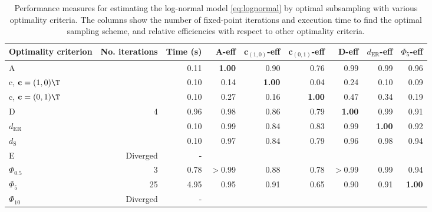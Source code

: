 \begin{table}[htb!]
\centering
\caption{Performance measures for estimating the log-normal model \eqref{eq:lognormal} by optimal subsampling with various optimality criteria. The columns show the number of fixed-point iterations and execution time to find the optimal sampling scheme, and relative efficiencies with respect to other optimality criteria.} 
\label{tab:baseline_impact_speed}
\begin{tabular}{lrrrrrrrr}
 Optimality criterion & No. iterations & Time (s) & A-eff & c$_{(1,0)}$-eff & c$_{(0,1)}$-eff & D-eff & $d_{\mathrm{ER}}$-eff & $\Phi_5$-eff \\ 
  \hline
A &  & 0.11 & \textbf{1.00} & 0.90 & 0.76 & 0.99 & 0.99 & 0.96 \\ 
  c, $\mathbf{c} = (1,0)\T$ &  & 0.10 & 0.14 & \textbf{1.00} & 0.04 & 0.24 & 0.10 & 0.09 \\ 
  c, $\mathbf{c} = (0,1)\T$ &  & 0.10 & 0.27 & 0.16 & \textbf{1.00} & 0.47 & 0.34 & 0.19 \\ 
  D & 4 & 0.96 & 0.98 & 0.86 & 0.79 & \textbf{1.00} & 0.99 & 0.91 \\ 
  $d_{\mathrm{ER}}$ &  & 0.10 & 0.99 & 0.84 & 0.83 & 0.99 & \textbf{1.00} & 0.92 \\ 
  $d_{\mathrm{S}}$ &  & 0.10 & 0.97 & 0.84 & 0.79 & 0.96 & 0.98 & 0.94 \\ 
  E & Diverged & - &  &  &  &  &  &  \\ 
  $\Phi_{0.5}$ & 3 & 0.78 & $>$0.99 & 0.88 & 0.78 & $>$0.99 & 0.99 & 0.94 \\ 
  $\Phi_5$ & 25 & 4.95 & 0.95 & 0.91 & 0.65 & 0.90 & 0.91 & \textbf{1.00} \\ 
  $\Phi_{10}$ & Diverged & - &  &  &  &  &  &  \\ 
   \hline
\end{tabular}
\end{table}
